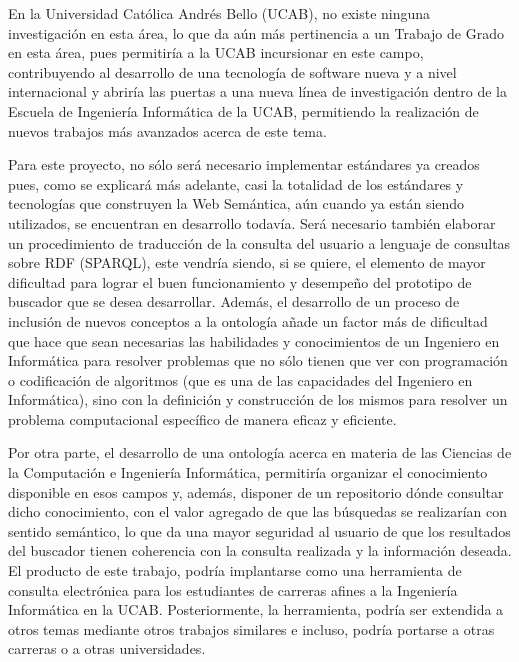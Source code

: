 En la Universidad Católica Andrés Bello (UCAB), no existe ninguna investigación en esta área, lo que da aún más pertinencia a un Trabajo de Grado en esta área, pues permitiría a la UCAB incursionar en este campo, contribuyendo al desarrollo de una tecnología de software nueva y a nivel internacional y abriría las puertas a una nueva línea de investigación dentro de la Escuela de Ingeniería Informática de la UCAB, permitiendo la realización de nuevos trabajos más avanzados acerca de este tema.

Para este proyecto, no sólo será necesario implementar estándares ya creados pues, como se explicará más adelante, casi la totalidad de los estándares y tecnologías que construyen la Web Semántica, aún cuando ya están siendo utilizados, se encuentran en desarrollo todavía. Será necesario también elaborar un procedimiento de traducción de la consulta del usuario a lenguaje de consultas sobre RDF (SPARQL), este vendría siendo, si se quiere, el elemento de mayor dificultad para lograr el buen funcionamiento y desempeño del prototipo de buscador que se desea desarrollar. Además, el desarrollo de un proceso de inclusión de nuevos conceptos a la ontología añade un factor más de dificultad que hace que sean necesarias las habilidades y conocimientos de un Ingeniero en Informática para resolver problemas que no sólo tienen que ver con programación o codificación de algoritmos (que es una de las capacidades del Ingeniero en Informática), sino con la definición y construcción de los mismos para resolver un problema computacional específico de manera eficaz y eficiente.

Por otra parte, el desarrollo de una ontología acerca en materia de las Ciencias de la Computación e Ingeniería Informática, permitiría organizar el conocimiento disponible en esos campos y, además, disponer de un repositorio dónde consultar dicho conocimiento, con el valor agregado de que las búsquedas se realizarían con sentido semántico, lo que da una mayor seguridad al usuario de que los resultados del buscador tienen coherencia con la consulta realizada y la información deseada. El producto de este trabajo, podría implantarse como una herramienta de consulta electrónica para los estudiantes de carreras afines a la Ingeniería Informática en la UCAB. Posteriormente, la herramienta, podría ser extendida a otros temas mediante otros trabajos similares e incluso, podría portarse a otras carreras o a otras universidades.

\newpage
